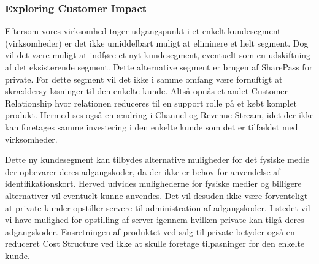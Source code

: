 \subsubsection{Exploring Customer Impact}
Eftersom vores virksomhed tager udgangspunkt i et enkelt kundesegment (virksomheder) er det ikke umiddelbart muligt at eliminere et helt segment.
Dog vil det være muligt at indføre et nyt kundesegment, eventuelt som en udskiftning af det eksisterende segment.
Dette alternative segment er brugen af SharePass for private.
For dette segment vil det ikke i samme omfang være fornuftigt at skræddersy løsninger til den enkelte kunde.
Altså opnås et andet Customer Relationship hvor relationen reduceres til en support rolle på et købt komplet produkt.
Hermed ses også en ændring i Channel og Revenue Stream, idet der ikke kan foretages samme investering i den enkelte kunde som det er tilfældet med virksomheder.

Dette ny kundesegment kan tilbydes alternative muligheder for det fysiske medie der opbevarer deres adgangskoder, da der ikke er behov for anvendelse af identifikationskort.
Herved udvides mulighederne for fysiske medier og billigere alternativer vil eventuelt kunne anvendes.
Det vil desuden ikke være forventeligt at private kunder opstiller servere til administration af adgangskoder.
I stedet vil vi have mulighed for opstilling af server igennem hvilken private kan tilgå deres adgangskoder.
Ensretningen af produktet ved salg til private betyder også en reduceret Cost Structure ved ikke at skulle foretage tilpasninger for den enkelte kunde.


